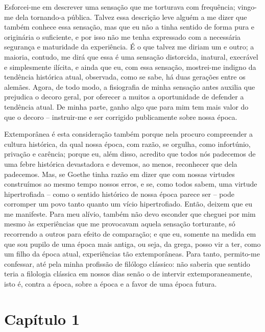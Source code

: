 Esforcei-me em descrever uma sensação que me torturava com frequência;
vingo-me dela tornando-a pública. Talvez essa descrição leve alguém a me
dizer que também conhece essa sensação, mas que eu não a tinha sentido
de forma pura e originária o suficiente, e por isso não me tenha
expressado com a necessária segurança e maturidade da experiência. É o
que talvez me diriam um e outro; a maioria, contudo, me dirá que essa é
uma sensação distorcida, inatural, execrável e simplesmente ilícita, e
ainda que eu, com essa sensação, mostrei-me indigno da tendência
histórica atual, observada, como se sabe, há duas gerações entre os
alemães. Agora, de todo modo, a fisiografia de minha sensação antes
auxilia que prejudica o decoro geral, por oferecer a muitos a
oportunidade de defender a tendência atual. De minha parte, ganho algo
que para mim tem mais valor do que o decoro -- instruir-me e ser
corrigido publicamente sobre nossa época.

Extemporânea é esta consideração também porque nela procuro compreender
a cultura histórica, da qual nossa época, com razão, se orgulha, como
infortúnio, privação e carência; porque eu, além disso, acredito que
todos nós padecemos de uma febre histórica devastadora e devemos, ao
menos, reconhecer que dela padecemos. Mas, se Goethe tinha razão em dizer que
com nossas virtudes construímos ao mesmo tempo nossos erros,
e se, como todos sabem, uma virtude hipertrofiada -- como o sentido histórico
de nossa época parece ser -- pode corromper um povo tanto quanto um
vício hipertrofiado. Então, deixem que eu me manifeste. Para meu alívio,
também não devo esconder que cheguei por mim mesmo às experiências que
me provocavam aquela sensação torturante, só recorrendo a outros para
efeito de comparação; e que eu, somente na medida em que sou pupilo de
uma época mais antiga, ou seja, da grega, posso vir a ter, como um filho
da época atual, experiências tão extemporâneas. Para tanto, permito-me
confessar, até pela minha profissão de filólogo clássico: não saberia
que sentido teria a filologia clássica em nossos dias senão o de
intervir extemporaneamente, isto é, contra a época, sobre a época e a
favor de uma época futura.\label{epocafutura}

\chapter{Capítulo 1}

